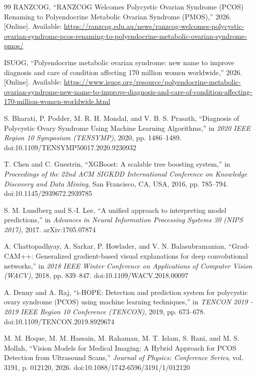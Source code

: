 \documentclass[conference]{IEEEtran}
\begin{document}
\begin{thebibliography}{99}
RANZCOG, ``RANZCOG Welcomes Polycystic Ovarian Syndrome (PCOS) Renaming to Polyendocrine Metabolic Ovarian Syndrome (PMOS),'' 2026. [Online]. Available: \url{https://ranzcog.edu.au/news/ranzcog-welcomes-polycystic-ovarian-syndrome-pcos-renaming-to-polyendocrine-metabolic-ovarian-syndrome-pmos/}

ISUOG, ``Polyendocrine metabolic ovarian syndrome: new name to improve diagnosis and care of condition affecting 170 million women worldwide,'' 2026. [Online]. Available: \url{https://www.isuog.org/resource/polyendocrine-metabolic-ovarian-syndrome-new-name-to-improve-diagnosis-and-care-of-condition-affecting-170-million-women-worldwide.html}

S. Bharati, P. Podder, M. R. H. Mondal, and V. B. S. Prasath, ``Diagnosis of Polycystic Ovary Syndrome Using Machine Learning Algorithms,'' in \textit{2020 IEEE Region 10 Symposium (TENSYMP)}, 2020, pp. 1486--1489. doi:10.1109/TENSYMP50017.2020.9230932

T. Chen and C. Guestrin, ``XGBoost: A scalable tree boosting system,'' in \textit{Proceedings of the 22nd ACM SIGKDD International Conference on Knowledge Discovery and Data Mining}, San Francisco, CA, USA, 2016, pp. 785--794. doi:10.1145/2939672.2939785

S. M. Lundberg and S.-I. Lee, ``A unified approach to interpreting model predictions,'' in \textit{Advances in Neural Information Processing Systems 30 (NIPS 2017)}, 2017. arXiv:1705.07874

A. Chattopadhyay, A. Sarkar, P. Howlader, and V. N. Balasubramanian, ``Grad-CAM++: Generalized gradient-based visual explanations for deep convolutional networks,'' in \textit{2018 IEEE Winter Conference on Applications of Computer Vision (WACV)}, 2018, pp. 839--847. doi:10.1109/WACV.2018.00097

A. Denny and A. Raj, ``i-HOPE: Detection and prediction system for polycystic ovary syndrome (PCOS) using machine learning techniques,'' in \textit{TENCON 2019 - 2019 IEEE Region 10 Conference (TENCON)}, 2019, pp. 673--678. doi:10.1109/TENCON.2019.8929674

M. M. Hoque, M. M. Hassain, M. Rahaman, M. T. Islam, S. Rani, and M. S. Mollah, ``Vision Models for Medical Imaging: A Hybrid Approach for PCOS Detection from Ultrasound Scans,'' \textit{Journal of Physics: Conference Series}, vol. 3191, p. 012120, 2026. doi:10.1088/1742-6596/3191/1/012120


\end{thebibliography}
\end{document}
